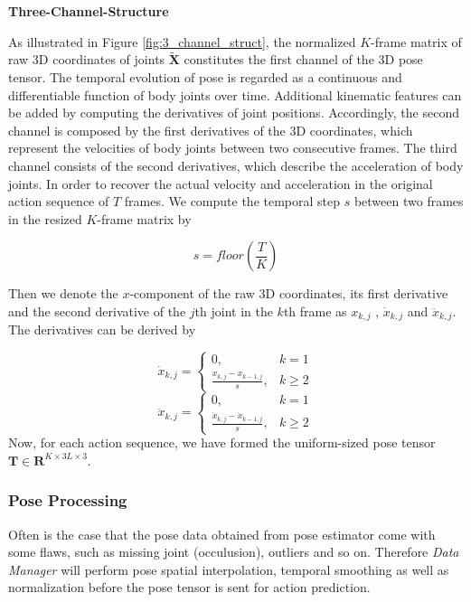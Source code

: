 \textbf{Three-Channel-Structure}

As illustrated in Figure \ref{fig:3_channel_struct}, the normalized $K$-frame matrix of raw 3D coordinates of joints $\tilde{\mathbf{X}}$ constitutes the first channel of the 3D pose tensor. The temporal evolution of pose is regarded as a continuous and differentiable function of body joints over time. Additional kinematic features can be added by computing the derivatives of joint positions. Accordingly, the second channel is composed by the first derivatives of the 3D coordinates, which
represent the velocities of body joints between two consecutive frames. The third channel consists of the second derivatives, which describe the acceleration of body joints. In order to recover the actual velocity and acceleration in the original action sequence of $T$ frames. We compute the temporal step $s$ between two frames in the resized $K$-frame matrix by

\begin{equation}
s = floor(\frac{T}{K})
\end{equation}

Then we denote the $x$-component of the raw 3D coordinates, its first derivative and the second derivative of the $j$th joint in the $k$th frame as $x_{k,j}$ , $\dot{x}_{k,j}$ and $\ddot{x}_{k,j}$. The derivatives can be derived by

\begin{equation}
\dot{x}_{k,j} = \left\{\begin{matrix} 0, & k = 1\\ \frac{x_{k,j} - x_{k-1, j}}{s}, & k\geq 2 \end{matrix}\right.
\end{equation}
\begin{equation}
\ddot{x}_{k,j} = \left\{\begin{matrix} 0, & k = 1\\ \frac{\dot{x}_{k,j} - \dot{x}_{k-1, j}}{s}, & k\geq 2 \end{matrix}\right.  
\end{equation}
Now, for each action sequence, we have formed the uniform-sized pose tensor $\mathbf{T} \in \mathbf{R}^{K \times 3L \times 3}$. 

\subsubsection{Pose Processing}

Often is the case that the pose data obtained from pose estimator come with some flaws, such as missing joint (occulusion), outliers and so on. Therefore \textit{Data Manager} will perform pose spatial interpolation, temporal smoothing as well as normalization before the pose tensor is sent for action prediction. 

